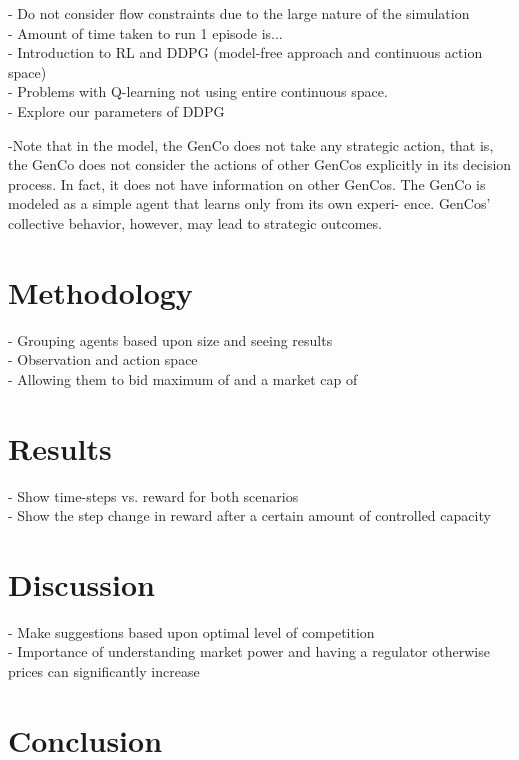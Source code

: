 \documentclass[conference]{IEEEtran}
\begin{document}
- Do not consider flow constraints due to the large nature of the simulation\\
- Amount of time taken to run 1 episode is...\\ 


- Introduction to RL and DDPG (model-free approach and continuous action space) \\
- Problems with Q-learning not using entire continuous space. \\
- Explore our parameters of DDPG

-Note that in the model, the GenCo does not take any strategic action, that is, the GenCo does not consider the actions of other GenCos explicitly in its decision process. In fact, it does not have information on other GenCos. The GenCo is modeled as a simple agent that learns only from its own experi- ence. GenCos’ collective behavior, however, may lead to strategic outcomes.\cite{EsmaeiliAliabadi2017}\\


\section{Methodology}

- Grouping agents based upon size and seeing results\\
- Observation and action space \\
- Allowing them to bid maximum of  and a market cap of 



\section{Results}

- Show time-steps vs. reward for both scenarios \\
- Show the step change in reward after a certain amount of controlled capacity

\section{Discussion}

- Make suggestions based upon optimal level of competition \\
- Importance of understanding market power and having a regulator otherwise prices can significantly increase

\section{Conclusion}
\end{document}
